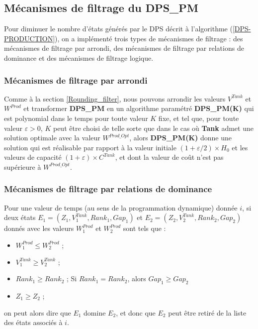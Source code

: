 \subsection{Mécanismes de filtrage du DPS\_PM}
Pour diminuer le nombre d'états générés par le DPS décrit à l'algorithme (\ref{DPS-PRODUCTION}), on a implémenté trois types de mécanismes de filtrage : des mécanismes de filtrage par arrondi, des mécanismes de filtrage par relations de dominance et des mécanismes de filtrage logique.
\subsubsection{Mécanismes de filtrage par arrondi}
 
Comme à la section \ref{Rounding_filter}, nous pouvons arrondir les valeurs $V^{Tank}$ et $W^{Prod}$ et transformer \textbf{DPS\_PM} en un algorithme paramétré \textbf{DPS\_PM(K)} qui est polynomial dans le temps pour toute valeur $K$ fixe, et tel que, pour toute valeur $\varepsilon > 0$, $K$ peut être choisi de telle sorte que dans le cas où \textbf{Tank} admet une solution optimale avec la valeur $W^{Prod\_Opt}$, alors \textbf{DPS\_PM(K)} donne une solution qui est réalisable par rapport à la valeur initiale $(1 + \varepsilon /2)\times H_0$ et les valeurs de capacité $(1+ \varepsilon)\times C^{Tank}$, et dont la valeur de coût n'est pas supérieure à $W^{Prod\_Opt}$. 


\subsubsection{Mécanismes de filtrage par relations de dominance}
Pour une valeur de temps (au sens de la programmation dynamique) donnée $i$, si deux états $E_1 = (Z_1, V^{Tank}_1 , Rank_1, Gap_1)$ et $E_2 = (Z_2, V^{Tank}_2 , Rank_2, Gap_2)$ donnés avec les valeurs $W^{Prod}_1$ et $W^{Prod}_2$ sont tels que :
\begin{itemize}[label=$\square$]
	\item  $W^{Prod}_1 \leq W^{Prod}_2$ ;
	\item  $V^{Tank}_1 \geq V^{Tank}_2$ ;
	\item $Rank_1 \geq Rank_2$ ; Si $Rank_1 = Rank_2$, alors $Gap_1 \geq Gap_2$ 
	\item $Z_1 \geq Z_2$ ;
\end{itemize}

on peut alors dire que $E_1$ domine $E_2$, et donc que $E_2$ peut être retiré de la liste des états associés à $i$. 

